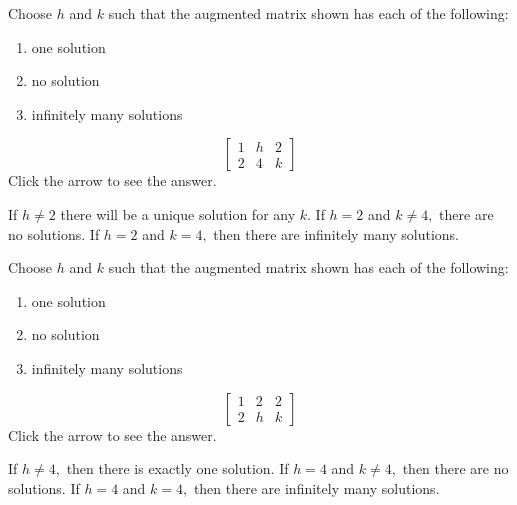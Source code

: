 \documentclass{ximera}
\begin{document}
\begin{problem}\label{prb:2.13}
Choose $h$ and $k$ such that the augmented matrix shown has each of the following:
\begin{enumerate}
\item one solution
\item no solution
\item infinitely many solutions
\end{enumerate}
\begin{equation*}
\left[
\begin{array}{rr|r}
1 & h & 2 \\
2 & 4 & k
\end{array}
\right]
\end{equation*}
Click the arrow to see the answer. 
\begin{expandable}
If $h\neq 2$ there will be a unique solution for any $k$. If $h=2$ and $%
k\neq 4,$ there are no solutions. If $h=2$ and $k=4,$ then there are
infinitely many solutions.
\end{expandable}
\end{problem}


\begin{problem}\label{prb:2.14}
Choose $h$ and $k$ such that the augmented matrix shown has each of the following:
\begin{enumerate}
\item one solution
\item no solution
\item infinitely many solutions
\end{enumerate}
\begin{equation*}
\left[
\begin{array}{rr|r}
1 & 2 & 2 \\
2 & h & k
\end{array}
\right]
\end{equation*}
Click the arrow to see the answer. 
\begin{expandable}
If $h\neq 4,$ then there is exactly one solution. If $h=4$ and $k\neq 4,$
then there are no solutions. If $h=4$ and $k=4,$ then there are infinitely
many solutions.
\end{expandable}
\end{problem}
\end{document}
